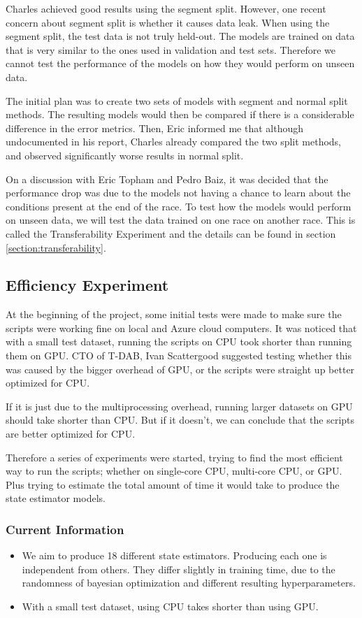 \documentclass[12pt,twoside]{report}
\begin{document}
Charles achieved good results using the segment split. However, one recent concern about segment split is whether it causes data leak. When using the segment split, the test data is not truly held-out. The models are trained on data that is very similar to the ones used in validation and test sets. Therefore we cannot test the performance of the models on how they would perform on unseen data.

The initial plan was to create two sets of models with segment and normal split methods. The resulting models would then be compared if there is a considerable difference in the error metrics. Then, Eric informed me that although undocumented in his report, Charles already compared the two split methods, and observed significantly worse results in normal split.

On a discussion with Eric Topham and Pedro Baiz, it was decided that the performance drop was due to the models not having a chance to learn about the conditions present at the end of the race. To test how the models would perform on unseen data, we will test the data trained on one race on another race. This is called the Transferability Experiment and the details can be found in section \ref{section:transferability}.

\subsection{Efficiency Experiment}
At the beginning of the project, some initial tests were made to make sure the scripts were working fine on local and Azure cloud computers. It was noticed that with a small test dataset, running the scripts on CPU took shorter than running them on GPU. CTO of T-DAB, Ivan Scattergood suggested testing whether this was caused by the bigger overhead of GPU, or the scripts were straight up better optimized for CPU.

If it is just due to the multiprocessing overhead, running larger datasets on GPU should take shorter than CPU. But if it doesn't, we can conclude that the scripts are better optimized for CPU.

Therefore a series of experiments were started, trying to find the most efficient way to run the scripts; whether on single-core CPU, multi-core CPU, or GPU. Plus trying to estimate the total amount of time it would take to produce the state estimator models.

\subsubsection{Current Information}
\begin{itemize}
  \item We aim to produce 18 different state estimators. Producing each one is independent from others. They differ slightly in training time, due to the randomness of bayesian optimization and different resulting hyperparameters.
  \item With a small test dataset, using CPU takes shorter than using GPU.
\end{itemize}
\end{document}
